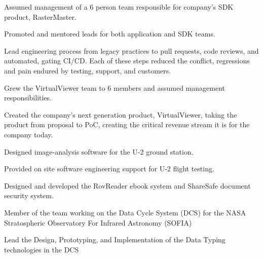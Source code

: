 \documentclass[letterpaper,10pt]{article}
\begin{document}
  \begin{resume_list}
    \item Assumed management of a 6 person team responsible for company's SDK product, RasterMaster.
    \item Promoted and mentored leads for both application and SDK teams.
    \item Lead engineering process from legacy practices to pull requests, code reviews, and automated, gating CI/CD. Each of these steps reduced the conflict, regressions and pain endured by testing, support, and customers.
  \end{resume_list}

     
  \begin{resume_list}
    \item Grew the VirtualViewer team to 6 members and assumed management responsibilities.
  \end{resume_list}

  \begin{resume_list}
      \item Created the company's next generation product, VirtualViewer, taking the product from proposal to PoC, creating the critical revenue stream it is for the company today.
  \end{resume_list}

  \begin{resume_list}
    \item Designed image-analysis software for the U-2 ground station.
    \item Provided on site software engineering support for U-2 flight testing.
  \end{resume_list}
  
  \begin{resume_list}
      \item Designed and developed the RovReader ebook system and ShareSafe document security system.
  \end{resume_list}
  
  \begin{resume_list}
    \item Member of the team working on the Data Cycle System (DCS) for the NASA Stratospheric Observatory For Infrared Astronomy (SOFIA)
    \item Lead the Design, Prototyping, and Implementation of the Data Typing technologies in the DCS 
  \end{resume_list}
\end{document}
